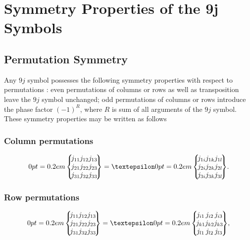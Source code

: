 \section{Symmetry Properties of the 9j Symbols}\label{sec:10.4}
\subsection{Permutation Symmetry}\label{sec:10.4.1}
Any $9 j$ symbol possesses the following symmetry properties with respect to permutations \cite{ref074}: even permutations of columns or rows as well as transposition leave the $9 j$ symbol unchanged; odd permutations of columns or rows introduce the phase factor $(-1)^{R}$, where $R$ is sum of all arguments of the $9 j$ symbol. These symmetry properties may be written as follows\\
\subsubsection{Column permutations}
\begin{equation}
\ninej{j_{11}}{j_{12}}{j_{13}}{j_{21}}{j_{22}}{j_{23}}{j_{31}}{j_{32}}{j_{33}} =\varepsilon\ninej{j_{1 i}}{j_{1 k}}{j_{1 l}}{j_{2 i}}{j_{2 k}}{j_{2 l}}{j_{3 i}}{j_{3 k}}{j_{3 l}}. \label{eq:10:4:1}
\end{equation}
\subsubsection{Row permutations}
\begin{equation}
\ninej{j_{11}}{j_{12}}{j_{13}}{j_{21}}{j_{22}}{j_{23}}{j_{31}}{j_{32}}{j_{33}} =\varepsilon\ninej{j_{i 1}}{j_{i 2}}{j_{i 3}}{j_{k 1}}{j_{k 2}}{j_{k 3}}{j_{l 1}}{j_{l 2}}{j_{l 3}}, \label{eq:10:4:2}
\end{equation}
